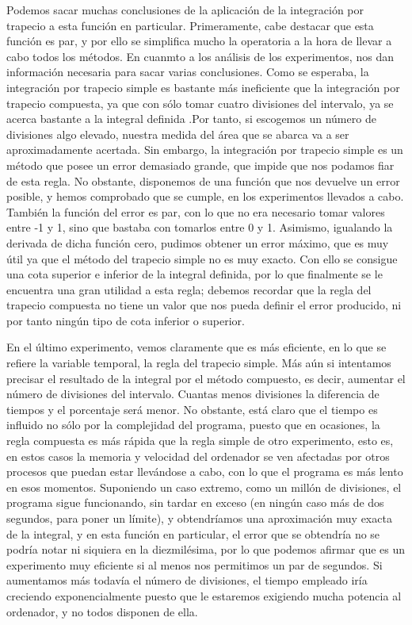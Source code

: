 
Podemos sacar muchas conclusiones de la aplicación de la integración por trapecio a esta función en particular.
Primeramente, cabe destacar que esta función es par, y por ello se simplifica mucho la operatoria a la hora de llevar a cabo todos los métodos.
En cuanmto a los análisis de los experimentos, nos dan información necesaria para sacar varias conclusiones. Como se esperaba, la integración por trapecio simple
es bastante más ineficiente que la integración por trapecio compuesta, ya que con sólo tomar cuatro divisiones del intervalo, ya se acerca bastante a la integral
definida .Por tanto, si escogemos un número de divisiones algo elevado, nuestra medida del área que se abarca va a ser aproximadamente acertada. 
Sin embargo, la integración por trapecio simple es un método que posee un error demasiado grande, que impide que nos podamos fiar de esta regla.
 No obstante, disponemos de una función que nos devuelve un error posible, y hemos comprobado que se cumple, en los experimentos llevados a cabo.
También la función del error es par, con lo que no era necesario tomar valores entre -1 y 1, sino que bastaba con tomarlos entre 0 y 1. Asimismo, igualando la
derivada de dicha función cero, pudimos obtener un error máximo, que es muy útil ya que el método del trapecio simple no es muy exacto. Con ello se consigue una cota 
superior e inferior de la integral definida, por lo que finalmente se le encuentra una gran utilidad a esta regla; debemos recordar que la regla del
trapecio compuesta no tiene un valor que nos pueda definir el error producido, ni por tanto ningún tipo de cota inferior o superior.

En el último experimento, vemos claramente que es más eficiente, en lo que se refiere la variable temporal, la regla del trapecio simple. Más aún si intentamos
precisar el resultado de la integral por el método compuesto, es decir, aumentar el número de divisiones del intervalo. Cuantas menos divisiones la diferencia de tiempos
y el porcentaje será menor. No obstante, está claro que el tiempo es influido no sólo por la complejidad del programa, puesto que en ocasiones, la regla compuesta
es más rápida que la regla simple de otro experimento, esto es, en estos casos la memoria y velocidad del ordenador se ven afectadas por otros procesos que 
puedan estar llevándose a cabo, con lo que el programa es más lento en esos momentos. Suponiendo un caso extremo, como un millón de divisiones, el programa sigue
funcionando, sin tardar en exceso (en ningún caso más de dos segundos, para poner un límite), y obtendríamos una aproximación muy exacta de la integral, y en esta
función en particular, el error que se obtendría no se podría notar ni siquiera en la diezmilésima, por lo que podemos afirmar que es un experimento muy eficiente si al 
menos nos permitimos un par de segundos. Si aumentamos más todavía el número de divisiones, el tiempo empleado iría creciendo exponencialmente puesto que le estaremos
exigiendo mucha potencia al ordenador, y no todos disponen de ella.

